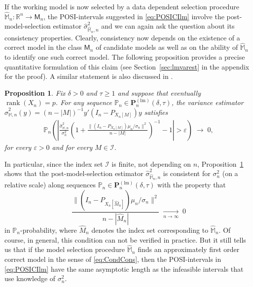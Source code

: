 \documentclass[preprint]{imsart}
\newcommand{\R}{{\mathbb R}}
\renewcommand{\P}{{\mathbb P}}
\newcommand{\eps}{\varepsilon}
\newcommand{\M}{\mathbb M}
\DeclareMathOperator{\rank}{rank}
\newtheorem{proposition}[theorem]{Proposition}
\numberwithin{equation}{section}
\begin{document}
If the working model is now selected by a data dependent selection procedure $\hat{\M}_n : \R^n \to \mathsf{M}_n$, the POSI-intervals suggested in \eqref{eq:POSICIlm} involve the post-model-selection estimator $\hat{\sigma}_{\hat{\M}_n,n}^2$ and we can again ask the question about its consistency properties. Clearly, consistency now depends on the existence of a correct model in the class $\mathsf{M}_n$ of candidate models as well as on the ability of $\hat{\M}_n$ to identify one such correct model. The following proposition provides a precise quantitative formulation of this claim (see Section~\ref{sec:lmvarest} in the appendix for the proof). A similar statement is also discussed in \citet[][Theorem~3.6 and Lemma~C.2]{bachoc14valid}.

\begin{proposition}\label{prop:lmvarest}
Fix $\delta>0$ and $\tau\ge 1$ and suppose that eventually $\rank(X_n)=p$. For any sequence $\P_n \in\mathbf{P}_n^{(\mathrm{lm})}(\delta,\tau)$, the variance estimator $\hat{\sigma}_{\M,n}^2(y) = (n-|M|)^{-1}y'(I_n-P_{X_n[M]})y$ satisfies
\begin{align*}
\P_n\left( \left|\frac{\hat{\sigma}_{\M,n}^2}{\sigma_n^2} \left(1 + \frac{\|(I_n-P_{X_n[M]})\mu_n/\sigma_n\|^2}{n-|M|}\right)^{-1} - 1\right| > \eps \right)
\;\to\;0,
\end{align*}
for every $\eps>0$ and for every $M\in\mathcal I$.
\end{proposition}

In particular, since the index set $\mathcal I$ is finite, not depending on $n$, Proposition~\ref{prop:lmvarest} shows that the post-model-selection estimator $\hat{\sigma}_{\hat{\M}_n,n}^2$ is consistent for $\sigma_n^2$ (on a relative scale) along sequences $\P_n\in\mathbf{P}_n^{(\mathrm{lm})}(\delta,\tau)$ with the property that 
\begin{equation}\label{eq:CondCons}
\frac{\|(I_n-P_{X_n[\hat{M}_n]})\mu_n/\sigma_n\|^2}{n-|\hat{M}_n|} \;\xrightarrow[n\to\infty]{}\; 0
\end{equation}
in $\P_n$-probability, where $\hat{M}_n$ denotes the index set corresponding to $\hat{\mathbb{M}}_n$. Of course, in general, this condition can not be verified in practice. But it still tells us that if the model selection procedure $\hat{\M}_n$ finds an approximately first order correct model in the sense of \eqref{eq:CondCons}, then the POSI-intervals in \eqref{eq:POSICIlm} have the same asymptotic length as the infeasible intervals that use knowledge of $\sigma_n^2$. 
\end{document}
